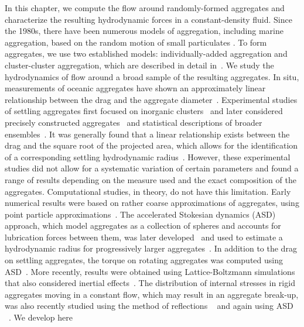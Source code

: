 %
In this chapter, we compute	the flow around randomly-formed aggregates and 
characterize the resulting hydrodynamic forces in a constant-density fluid.
Since the 1980s, there have been numerous models of aggregation, including marine aggregation, based on the random motion of small particulates 
\cite{rosenstock_cluster_1980, witten_diffusion-limited_1981,witten_tenuous_1986,kolb_anisotropic_1987}. To form aggregates, we use two established models: individually-added aggregation and cluster-cluster aggregation, which are described in detail in~\cite{yoo_hydrodynamic_2020}. 
We study the hydrodynamics of flow around a broad sample of the resulting aggregates.
In situ, measurements of oceanic aggregates have shown an approximately linear relationship between the drag and the aggregate diameter~\cite{alldredge_situ_1988}. Experimental studies of settling aggregates first focused on inorganic clusters~\cite{wiltzius_hydrodynamic_1987} and later considered precisely constructed aggregates~\cite{takayasu_determination_1998} and statistical descriptions of broader ensembles~\cite{johnson_settling_1996}. 
It was generally found that a linear relationship exists between the drag and the square root of the projected area, which allows for the identification of a corresponding settling hydrodynamic radius~\cite{johnson_settling_1996, tang_model_2002}.
However, these experimental studies did not allow for a systematic variation of certain parameters and found a range of results depending on the measure used and the exact composition of the aggregates.  Computational studies, in theory, do not have this limitation. Early numerical results were based on rather coarse approximations of aggregates, using point particle approximations~\cite{chen_translational_1984}. The accelerated Stokesian dynamics (ASD) approach, which model aggregates as a collection of spheres and accounts for lubrication forces between them, was later developed~\cite{brady_stokesian_1988} and used to estimate a hydrodynamic radius for progressively larger aggregates~\cite{rogak_stokes_1990,bossis_hydrodynamic_1991}.
In addition to the drag on settling aggregates, the torque on rotating aggregates 
was computed using ASD~\cite{binder_structural_2009}. More recently, results were obtained using Lattice-Boltzmann simulations that also considered inertial effects~\cite{zhang_direct_2015}. The distribution of internal stresses in rigid aggregates moving in a constant flow, which may result in an aggregate break-up, was also recently studied using the method of reflections ~\cite{gastaldi_distribution_2011} and again using ASD ~\cite{vanni_accurate_2015}. We develop here 
